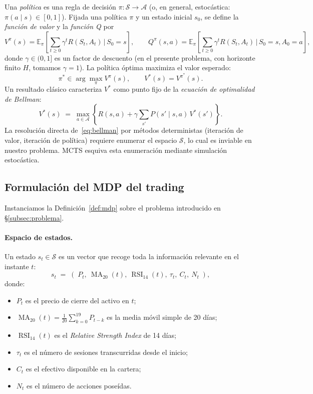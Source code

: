 Una \emph{política} es una regla de decisión $\pi: \mathcal{S} \to \mathcal{A}$ (o, en general, estocástica: $\pi(a\mid s) \in [0,1]$). Fijada una política $\pi$ y un estado inicial $s_0$, se define la \emph{función de valor} y la \emph{función Q} por
\[
    V^\pi(s) = \mathbb{E}_\pi\!\left[\sum_{t \geq 0} \gamma^t R(S_t, A_t) \,\Big|\, S_0 = s\right],
    \qquad
    Q^\pi(s, a) = \mathbb{E}_\pi\!\left[\sum_{t\geq 0} \gamma^t R(S_t, A_t) \,\Big|\, S_0 = s, A_0 = a\right],
\]
donde $\gamma \in (0, 1]$ es un factor de descuento (en el presente problema, con horizonte finito $H$, tomamos $\gamma = 1$). La política óptima maximiza el valor esperado:
\[
    \pi^* \in \arg\max_{\pi} V^\pi(s), \qquad V^*(s) = V^{\pi^*}(s).
\]
Un resultado clásico caracteriza $V^*$ como punto fijo de la \emph{ecuación de optimalidad de Bellman}:
\begin{equation}
    V^*(s) \;=\; \max_{a \in \mathcal{A}}\left\{ R(s,a) + \gamma \sum_{s'} P(s'\mid s,a)\, V^*(s') \right\}.
    \label{eq:bellman}
\end{equation}
La resolución directa de~\eqref{eq:bellman} por métodos deterministas (iteración de valor, iteración de política) requiere enumerar el espacio $\mathcal{S}$, lo cual es inviable en nuestro problema. MCTS esquiva esta enumeración mediante simulación estocástica.

\subsection{Formulación del MDP del trading}
\label{subsec:mdp-trading}

Instanciamos la Definición~\ref{def:mdp} sobre el problema introducido en §\ref{subsec:problema}.

\paragraph{Espacio de estados.} Un estado $s_t \in \mathcal{S}$ es un vector que recoge toda la información relevante en el instante $t$:
\[
    s_t \;=\; \left(\; P_t,\ \operatorname{MA}_{20}(t),\ \operatorname{RSI}_{14}(t),\ \tau_t,\ C_t,\ N_t \;\right),
\]
donde:
\begin{itemize}
    \item $P_t$ es el precio de cierre del activo en $t$;
    \item $\operatorname{MA}_{20}(t) = \tfrac{1}{20}\sum_{k=0}^{19} P_{t-k}$ es la media móvil simple de 20 días;
    \item $\operatorname{RSI}_{14}(t)$ es el \emph{Relative Strength Index} de 14 días;
    \item $\tau_t$ es el número de sesiones transcurridas desde el inicio;
    \item $C_t$ es el efectivo disponible en la cartera;
    \item $N_t$ es el número de acciones poseídas.
\end{itemize}

